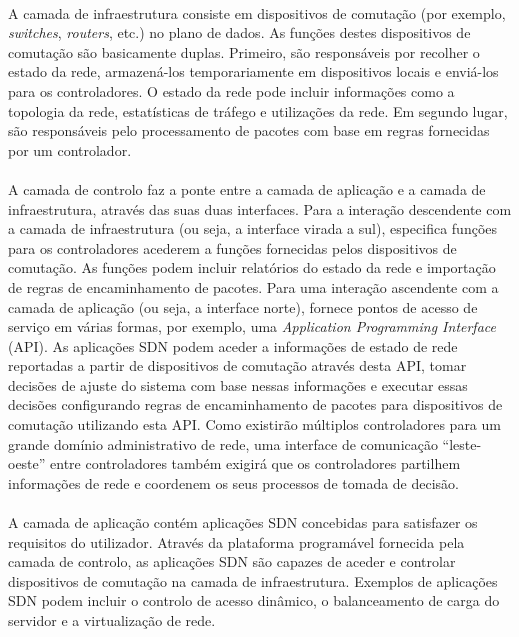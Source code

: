 \documentclass{llncs}
\begin{document}
\paragraph{}

A camada de infraestrutura consiste em dispositivos de comutação (por exemplo, \textit{switches}, \textit{routers}, etc.) no plano de dados.
As funções destes dispositivos de comutação são basicamente duplas. 
Primeiro, são responsáveis por recolher o estado da rede, armazená-los temporariamente em dispositivos locais e enviá-los para os controladores. 
O estado da rede pode incluir informações como a topologia da rede, estatísticas de tráfego e utilizações da rede. 
Em segundo lugar, são responsáveis pelo processamento de pacotes com base em regras fornecidas por um controlador.
\paragraph{}
A camada de controlo faz a ponte entre a camada de aplicação e a camada de infraestrutura, através das suas duas interfaces. Para a interação descendente com a camada de infraestrutura (ou seja, a interface virada a sul), especifica funções para os controladores acederem a funções fornecidas pelos dispositivos de comutação. As funções podem incluir relatórios do estado da rede e importação de regras de encaminhamento de pacotes. Para uma interação ascendente com a camada de aplicação (ou seja, a interface norte), fornece pontos de acesso de serviço em várias formas, por exemplo, uma \textit{Application Programming Interface} (API). As aplicações SDN podem aceder a informações de estado de rede reportadas a partir de dispositivos de comutação através desta API, tomar decisões de ajuste do sistema com base nessas informações e executar essas decisões configurando regras de encaminhamento de pacotes para dispositivos de comutação utilizando esta API. Como existirão múltiplos controladores para um grande domínio administrativo de rede, uma interface de comunicação “leste-oeste” entre controladores também exigirá que os controladores partilhem informações de rede e coordenem os seus processos de tomada de decisão.
\paragraph{}
A camada de aplicação contém aplicações SDN concebidas para satisfazer os requisitos do utilizador. Através da plataforma programável fornecida pela camada de controlo, as aplicações SDN são capazes de aceder e controlar dispositivos de comutação na camada de infraestrutura. Exemplos de aplicações SDN podem incluir o controlo de acesso dinâmico, o balanceamento de carga do servidor e a virtualização de rede.
\end{document}

